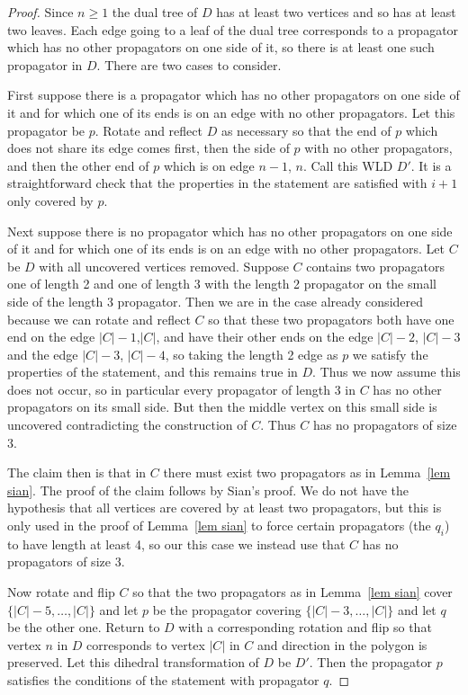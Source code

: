 \documentclass[11pt]{article}
\theoremstyle{remark}
\theoremstyle{definition}
\begin{document}
\begin{proof}
  Since $n\geq 1$ the dual tree of $D$ has at least two vertices and so has at least two leaves.  Each edge going to a leaf of the dual tree corresponds to a propagator which has no other propagators on one side of it, so there is at least one such propagator in $D$.  There are two cases to consider.

  First suppose there is a propagator which has no other propagators on one side of it and for which one of its ends is on an edge with no other propagators.  Let this propagator be $p$.  Rotate and reflect $D$ as necessary so that the end of $p$ which does not share its edge comes first, then the side of $p$ with no other propagators, and then the other end of $p$ which is on edge $n-1$, $n$.  Call this WLD $D'$.  It is a straightforward check that the properties in the statement are satisfied with $i+1$ only covered by $p$.

  Next suppose there is no propagator which has no other propagators on one side of it and for which one of its ends is on an edge with no other propagators.  Let $C$ be $D$ with all uncovered vertices removed.  Suppose $C$ contains two propagators one of length 2 and one of length 3 with the length 2 propagator on the small side of the length 3 propagator.  Then we are in the case already considered because we can rotate and reflect $C$ so that these two propagators both have one end on the edge $|C|-1$,$|C|$, and have their other ends on the edge $|C|-2$, $|C|-3$ and the edge $|C|-3$, $|C|-4$, so taking the length 2 edge as $p$ we satisfy the properties of the statement, and this remains true in $D$.  Thus we now assume this does not occur, so in particular every propagator of length 3 in $C$ has no other propagators on its small side.  But then the middle vertex on this small side is uncovered contradicting the construction of $C$.  Thus $C$ has no propagators of size 3.

  The claim then is that in $C$ there must exist two propagators as in Lemma~\ref{lem sian}.  The proof of the claim follows by Sian's proof.  We do not have the hypothesis that all vertices are covered by at least two propagators, but this is only used in the proof of Lemma~\ref{lem sian} to force certain propagators (the $q_i$) to have length at least 4, so our this case we instead use that $C$ has no propagators of size $3$.

  Now rotate and flip $C$ so that the two propagators as in Lemma~\ref{lem sian} cover $\{|C|-5, \ldots, |C|\}$ and let $p$ be the propagator covering $\{|C|-3, \ldots, |C|\}$ and let $q$ be the other one.  Return to $D$ with a corresponding rotation and flip so that vertex $n$ in $D$ corresponds to vertex $|C|$ in $C$ and direction in the polygon is preserved.  Let this dihedral transformation of $D$ be $D'$.  Then the propagator $p$ satisfies the conditions of the statement with propagator $q$.
\end{proof}
\end{document}
